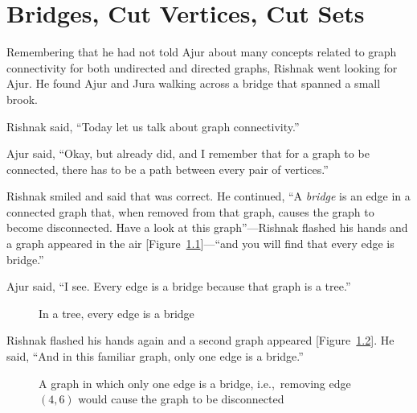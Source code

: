\chapter{Bridges, Cut Vertices, Cut Sets}

Remembering that he had not told Ajur about many concepts related to graph connectivity for both undirected and directed graphs, Rishnak went looking for Ajur. He found Ajur and Jura walking across a bridge that spanned a small brook.

Rishnak said, ``Today let us talk about graph connectivity.''

Ajur said, ``Okay, but already did, and I remember that for a graph to be connected, there has to be a path between every pair of vertices.''

Rishnak smiled and said that was correct. He continued, ``A \textit{bridge} is an edge in a connected graph that, when removed from that graph, causes the graph to become disconnected. Have a look at this graph''---Rishnak flashed his hands and a graph appeared in the air [Figure~\ref{14g1}]---``and you will find that every edge is bridge.''

Ajur said, ``I see. Every edge is a bridge because that graph is a tree.''

\begin{figure}
\begin{center}

\caption{In a tree, every edge is a bridge}\label{14g1}
\end{center}
\end{figure}

Rishnak flashed his hands again and a second graph appeared [Figure~\ref{14g2}]. He said, ``And in this familiar graph, only one edge is a bridge.''

\begin{figure}
\begin{center}
\caption{A graph in which only one edge is a bridge, i.e.,~removing edge~$(4,6)$ would cause the graph to be disconnected}\label{14g2}
\end{center}
\end{figure}

